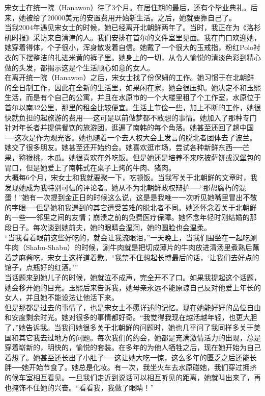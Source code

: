 宋女士在统一院（Hanawon）待了3个月。在居住期的最后，还有个毕业典礼。后来，她被给了20000美元的安置费用开始新生活。之后，她就要靠自己了。\\

当我2004年遇见宋女士的时候，她已经离开北朝鲜两年了。当时，我正在为《洛杉矶时报》采访来自清津的人。我们安排在首尔的文件室里见面。我在门口欢迎她，她穿着得体，个子很小，浑身散发着自信。她戴了一个很大的玉戒指，粉红Polo衬衣的下摆整洁的扎进米黄的裤子里。她身上的一切，从令人愉悦的清淡色彩到精心做的头发，都揭示这是个生活顺心如意的女人。\\

在离开统一院（Hanawon）之后，宋女士找了份保姆的工作。她习惯于在北朝鲜的全日制工作，因此在全新的生活里，如果闲在家，她会很压抑。她决定不和玉熙生活，而是有个自己的公寓，并且在水原市的一个大楼里租了个工作室，水原位于首尔以南32公里，那里的租金比较便宜。生活上节俭一些，加上不断的工作，她很快就负担的起旅游的费用──这可是以前做梦都不敢想的事情。她加入了那种专门针对年长者并提供餐饮的旅游团，逛遍了南韩的每个角落。她甚至还回了趟中国──这次是作为观光客。她也随着一个去人权大会上发言的脱北者团体去了波兰。她交了很多朋友。她甚至还开始约会。她喜欢逛市场，尝试各种新鲜东西──芒果，猕猴桃，木瓜。她很喜欢在外吃饭。但是她还是培养不来吃披萨饼或汉堡包的胃口，但是她爱上了南韩式在桌子上烤的牛肉、猪肉。\\

大概每6个月，宋女士和我就要聚一下，吃顿饭。当我写关于北朝鲜的文章时，我发现她成为我特别可信的评论者。她从不为北朝鲜政权辩护──“那帮腐朽的混蛋！”她有一次提到金正日的时候这么说，这是是我唯一一次听见她嘴里冒出不敬的字眼──但是她和我遇到的其它遭受苦难的脱北者不同。她还怀念着关于北朝鲜的一些──邻里之间的友情；崩溃之前的免费医疗保障。她怀念年轻时刚结婚的那段日子。每次谈到她前夫，她的眼睛会湿润，她的圆脸也会温柔。\\

“当我看着眼前这些好吃的，就会让我流眼泪，”一天晚上，当我们围坐在一起吃涮牛肉（Shabu-Shabu）的时候，涮牛肉就是把切成薄片的牛肉放进清汤里煮熟后蘸着芝麻酱吃，宋女士这样道着歉。“我禁不住想起长博最后的话，‘让我们去好点的馆子，点瓶好的红酒。’”\\

当话题来到她儿子的时候，她就泣不成声，完全开不了口。如果我提起这个话题，她会移开她的目光。玉熙后来告诉我，她母亲永远不能原谅自己反对他爱上年长的女人，并且她不能设法让他活下来。\\

但是那都是过去的事情了，也是宋女士不愿详述的记忆。现在她能好好的品位自由和安度剩余时光。她对很多的事情都好奇。“我觉得我现在越活越年轻，也更大胆了，”她告诉我。当我问她很多关于北朝鲜的问题时，她也几乎问了我同样多关于美国和其它我去过地方的问题。每次我们的约会，她都是充满激情活力的出现，总是穿着崭新的，明快的，愉悦的套装。在多年的为他人牺牲之后，现在她开始为自己着想了。她甚至还长出了小肚子──这让她大吃一惊，这么多年的匮乏之后还能长胖──她开始节食了。她总是化妆。有一次，我坐火车去水原碰她，我们穿过拥挤的候车室相互看见。一旦我们走近到说话可以相互听见的距离，她就叫出来了，再也掩饰不住她的兴奋。“看看我，我做了眼睛！”\\


